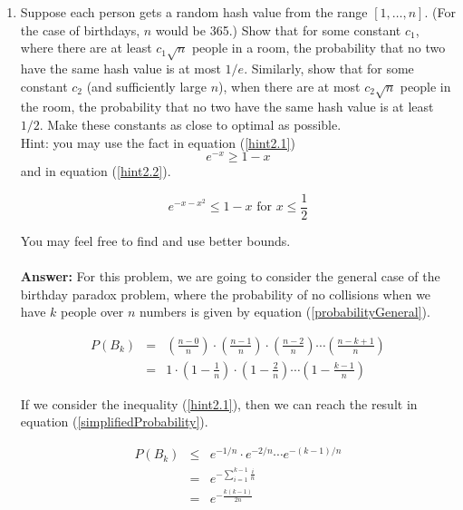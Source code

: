 \documentclass[tikz, 12pt]{scrartcl}
\begin{document}
\begin{enumerate}
	
	
	\item Suppose each person gets a random hash value from the range $[1, \ldots, n]$. (For the case of birthdays, $n$ would be 365.) Show that for some constant $c_1$, where there are at least $c_1 \sqrt{n}$ people in a room, the probability that no two have the same hash value is at most $1/e$. Similarly, show that for some constant $c_2$ (and sufficiently large $n$), when there are at most $c_2 \sqrt{n}$ people in the room, the probability that no two have the same hash value is at least $1/2$. Make these constants as close to optimal as possible.\\
	Hint: you may use the fact in equation (\ref{hint2.1})
	\begin{equation}\label{hint2.1}
		e^{-x} \geq 1 - x
	\end{equation}
	and in equation (\ref{hint2.2}).
	
	\begin{equation}\label{hint2.2}
	e^{-x - x^2} \leq 1 - x \mbox{ for } x \leq \frac{1}{2}
	\end{equation}
	
	You may feel free to find and use better bounds.\\
	\\
	\textbf{Answer: } For this problem, we are going to consider the general case of the birthday paradox problem, where the probability of no collisions when we have $k$ people over $n$ numbers is given by equation (\ref{probabilityGeneral}).
	
	\begin{eqnarray}
	P(B_k) 	&	=	&	\left( \frac{n - 0}{n} \right) \cdot  \left( \frac{n - 1}{n} \right) \cdot \left( \frac{n - 2}{n} \right)\cdots\left( \frac{n - k + 1}{n} \right) \nonumber \\
			&	=	&	1 \cdot \left(1 -  \frac{1}{n} \right)\cdot \left(1 -  \frac{2}{n} \right) \cdots \left(1 -  \frac{k-1}{n} \right)\label{probabilityGeneral}
	\end{eqnarray}
	
	If we consider the inequality (\ref{hint2.1}), then we can reach the result in equation (\ref{simplifiedProbability}).
	
	\begin{eqnarray}
	P(B_k)	&	\leq	&	e^{-1/n} \cdot e^{-2/n} \cdots e^{-(k - 1)/n} \nonumber \\
			&	=	&	e^{-\sum_{i = 1}^{k -1} \frac{i}{n}} \nonumber \\
			&	=	&	e^{-\frac{k(k-1)}{2n}} \label{simplifiedProbability}
	\end{eqnarray}
	

\end{enumerate}
\end{document}

